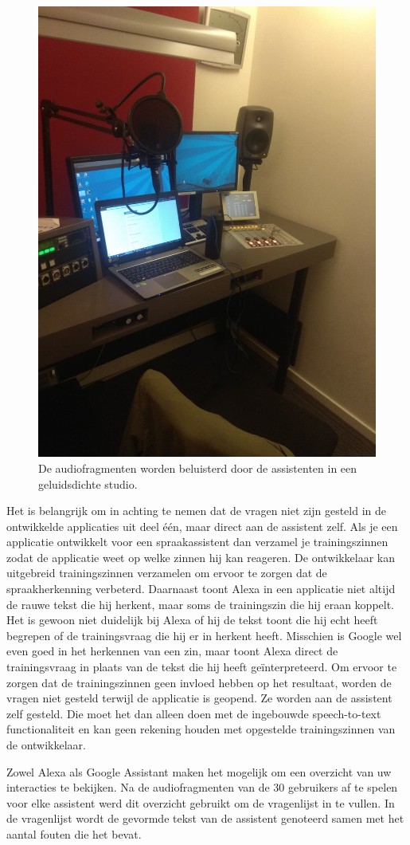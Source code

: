 \begin{figure}[H]
    \centering
    \includegraphics[width=0.7\linewidth]{img/proefafname3}
    \caption{De audiofragmenten worden beluisterd door de assistenten in een geluidsdichte studio.}
    \label{fig:proefafname2}
\end{figure}

Het is belangrijk om in achting te nemen dat de vragen niet zijn gesteld in de ontwikkelde applicaties uit deel één, maar direct aan de assistent zelf. Als je een applicatie ontwikkelt voor een spraakassistent dan verzamel je trainingszinnen zodat de applicatie weet op welke zinnen hij kan reageren. De ontwikkelaar kan uitgebreid trainingszinnen verzamelen om ervoor te zorgen dat de spraakherkenning verbeterd. Daarnaast toont Alexa in een applicatie niet altijd de rauwe tekst die hij herkent, maar soms de trainingszin die hij eraan koppelt. Het is gewoon niet duidelijk bij Alexa of hij de tekst toont die hij echt heeft begrepen of de trainingsvraag die hij er in herkent heeft. Misschien is Google wel even goed in het herkennen van een zin, maar toont Alexa direct de trainingsvraag in plaats van de tekst die hij heeft geïnterpreteerd. Om ervoor te zorgen dat de trainingszinnen geen invloed hebben op het resultaat, worden de vragen niet gesteld terwijl de applicatie is geopend. Ze worden aan de assistent zelf gesteld. Die moet het dan alleen doen met de ingebouwde speech-to-text functionaliteit en kan geen rekening houden met opgestelde trainingszinnen van de ontwikkelaar.

Zowel Alexa als Google Assistant maken het mogelijk om een overzicht van uw interacties te bekijken. Na de audiofragmenten van de 30 gebruikers af te spelen voor elke assistent werd dit overzicht gebruikt om de vragenlijst in te vullen. In de vragenlijst wordt de gevormde tekst van de assistent genoteerd samen met het aantal fouten die het bevat.